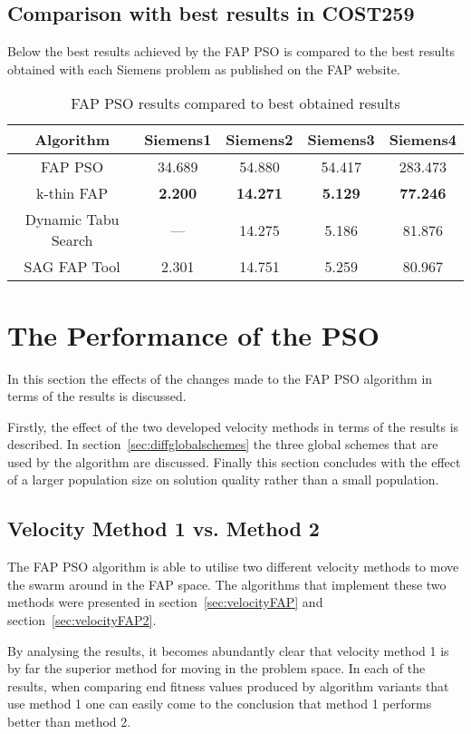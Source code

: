 \subsection{Comparison with best results in COST259}
Below the best results achieved by the FAP PSO is compared to the best results obtained with each Siemens problem as published on the FAP website\cite{FAPWeb}.
\begin{table}[H]
\centering
	\begin{tabular}{| c | c | c | c | c |}
	\hline
	Algorithm & Siemens1 & Siemens2 & Siemens3 & Siemens4 \\ \hline
	FAP PSO & 34.689 & 54.880 & 54.417 & 283.473 \\ \hline
	k-thin FAP & \textbf{2.200} & \textbf{14.271} & \textbf{5.129} & \textbf{77.246} \\ \hline
	Dynamic Tabu Search & --- & 14.275 & 5.186 & 81.876 \\ \hline
	SAG FAP Tool & 2.301 & 14.751 & 5.259 & 80.967 \\ \hline
	\end{tabular}
\caption{FAP PSO results compared to best obtained results}
\label{tab:siem4m2}
\end{table}
\section{The Performance of the PSO}
In this section the effects of the changes made to the FAP PSO algorithm in terms of the results is discussed. 

Firstly, the effect of the two developed velocity methods in terms of the results is described. In section~\ref{sec:diffglobalschemes} the three global schemes that are used by the algorithm are discussed. Finally this section concludes with the effect of a larger population size on solution quality rather than a small population.
\subsection{Velocity Method 1 vs. Method 2}
The FAP PSO algorithm is able to utilise two different velocity methods to move the swarm around in the FAP space. The algorithms that implement these two methods were presented in section~\ref{sec:velocityFAP} and section~\ref{sec:velocityFAP2}.

By analysing the results, it becomes abundantly clear that velocity method 1 is by far the superior method for moving in the problem space. In each of the results, when comparing end fitness values produced by algorithm variants that use method 1 one can easily come to the conclusion that method 1 performs better than method 2.

